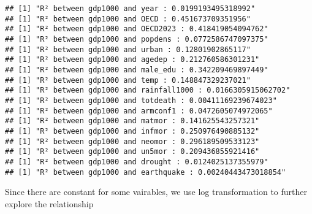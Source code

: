 \documentclass[
]{article}
\begin{document}
\begin{verbatim}
## [1] "R² between gdp1000 and year : 0.0199193495318992"
## [1] "R² between gdp1000 and OECD : 0.451673709351956"
## [1] "R² between gdp1000 and OECD2023 : 0.418419054094762"
## [1] "R² between gdp1000 and popdens : 0.0772586747097375"
## [1] "R² between gdp1000 and urban : 0.12801902865117"
## [1] "R² between gdp1000 and agedep : 0.212760586301231"
## [1] "R² between gdp1000 and male_edu : 0.342209469897449"
## [1] "R² between gdp1000 and temp : 0.148847329237021"
## [1] "R² between gdp1000 and rainfall1000 : 0.0166305915062702"
## [1] "R² between gdp1000 and totdeath : 0.00411169239674023"
## [1] "R² between gdp1000 and armconf1 : 0.0472605074972065"
## [1] "R² between gdp1000 and matmor : 0.141625543257321"
## [1] "R² between gdp1000 and infmor : 0.250976490885132"
## [1] "R² between gdp1000 and neomor : 0.296189509533123"
## [1] "R² between gdp1000 and un5mor : 0.209436855921416"
## [1] "R² between gdp1000 and drought : 0.0124025137355979"
## [1] "R² between gdp1000 and earthquake : 0.00240443473018854"
\end{verbatim}

Since there are constant for some vairables, we use log transformation
to further explore the relationship
\end{document}
